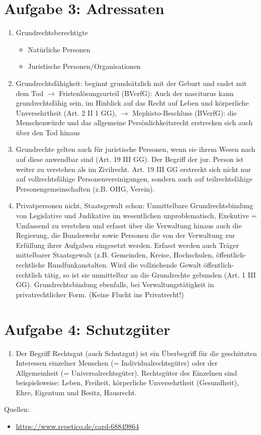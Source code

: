 \documentclass{article}
\begin{document}
	\section*{Aufgabe 3: Adressaten}
	\begin{enumerate}[label=(\alph*)]
		\item Grundrechtsberechtigte
		\begin{itemize}
			\item Natürliche Personen
			\item Juristische Personen/Organisationen
		\end{itemize}
		\item Grundrechtsfähigkeit: beginnt grundsätzlich mit der Geburt und endet mit dem Tod $\to$ Fristenlösungs\-urteil (BVerfG): Auch der nasciturus kann grundrechtsfähig sein, im Hinblick auf das Recht auf Leben und körperliche Unversehrtheit (Art. 2 II 1 GG), $\to$ Mephisto-Beschluss (BVerfG): die Menschenwürde und das allgemeine Persönlichkeitsrecht erstrecken sich auch über den Tod hinaus
		\item Grundrechte gelten auch für juristische Personen, wenn sie ihrem Wesen nach auf diese anwendbar sind (Art. 19 III GG). Der Begriff der jur. Person ist weiter zu verstehen als im Zivilrecht. Art. 19 III GG erstreckt sich nicht nur auf vollrechtsfähige Personenvereinigungen, sondern auch auf teilrechtsfähige Personengemeinschaften (z.B. OHG, Verein).
		\item Privatpersonen nicht, Staatsgewalt schon: Unmittelbare Grundrechtsbindung von Legislative und Judikative im wesentlichen unproblematisch, Exekutive = Umfassend zu verstehen und erfasst über die Verwaltung hinaus auch die Regierung, die Bundeswehr sowie Personen die von der Verwaltung zur Erfüllung ihrer Aufgaben eingesetzt werden. Erfasst werden auch Träger mittelbarer Staatsgewalt (z.B. Gemeinden, Kreise, Hochschulen, öffentlich-rechtliche Rundfunkanstalten. Wird die vollziehende Gewalt öffentlich-rechtlich tätig, so ist sie unmittelbar an die Grundrechte gebunden (Art. 1 III GG). Grundrechtsbindung ebenfalls, bei Verwaltungstätigkeit in privatrechtlicher Form. (Keine Flucht ins Privatrecht!)
	\end{enumerate}

	\section*{Aufgabe 4: Schutzgüter}
	\begin{enumerate}[label=(\alph*)]
		\item Der Begriff Rechtsgut (auch Schutzgut) ist ein Überbegriff für die geschützten Interessen einzelner Menschen (= Individualrechtsgüter) oder der Allgemeinheit (= Universalrechtsgüter). Rechtsgüter des Einzelnen sind beispielsweise: Leben, Freiheit, körperliche Unversehrtheit (Gesundheit), Ehre, Eigentum und Besitz, Hausrecht.
	\end{enumerate}

	Quellen:
	\begin{itemize}
		\item \url{https://www.repetico.de/card-68849864}
	\end{itemize}
	
\end{document}
